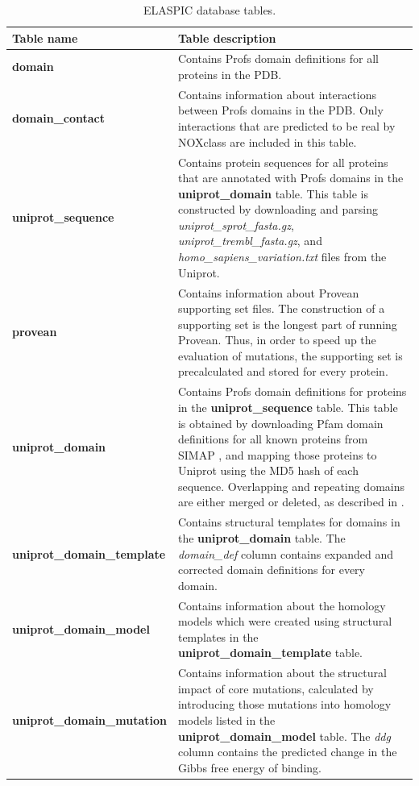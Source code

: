 \begin{table}[ht]
\caption{ELASPIC database tables.} \label{tab:elaspic_database_schema}
\begin{tabular}{l | p{10cm}}
	\toprule
	Table name & Table description \\
	\midrule
	\textbf{domain} & Contains Profs domain definitions for all proteins in the PDB. \\
	\textbf{domain\_contact} & Contains information about interactions between Profs domains in the PDB. Only interactions that are predicted to be real by NOXclass \cite{zhu_noxclass:_2006} are included in this table. \\
	\textbf{uniprot\_sequence} & Contains protein sequences for all proteins that are annotated with Profs domains in the \textbf{uniprot\_domain} table. This table is constructed by downloading and parsing \textit{uniprot\_sprot\_fasta.gz}, \textit{uniprot\_trembl\_fasta.gz}, and \textit{homo\_sapiens\_variation.txt} files from the Uniprot. \\
	\textbf{provean} & Contains information about Provean \cite{choi_predicting_2012} supporting set files. The construction of a supporting set is the longest part of running Provean. Thus, in order to speed up the evaluation of mutations, the supporting set is precalculated and stored for every protein. \\
	\textbf{uniprot\_domain} & Contains Profs domain definitions for proteins in the \textbf{uniprot\_sequence} table. This table is obtained by downloading Pfam domain definitions for all known proteins from SIMAP \cite{rattei_simapcomprehensive_2010}, and mapping those proteins to Uniprot using the MD5 hash of each sequence. Overlapping and repeating domains are either merged or deleted, as described in \cite{witvliet_elaspic_2016}. \\
	\textbf{uniprot\_domain\_template} & Contains structural templates for domains in the \textbf{uniprot\_domain} table. The \textit{domain\_def} column contains expanded and corrected domain definitions for every domain. \\
	\textbf{uniprot\_domain\_model} & Contains information about the homology models which were created using structural templates in the \textbf{uniprot\_domain\_template} table. \\
	\textbf{uniprot\_domain\_mutation} & Contains information about the structural impact of core mutations, calculated by introducing those mutations into homology models listed in the \textbf{uniprot\_domain\_model} table. The \textit{ddg} column contains the predicted change in the Gibbs free energy of binding. \\

\end{tabular}
\end{table}
